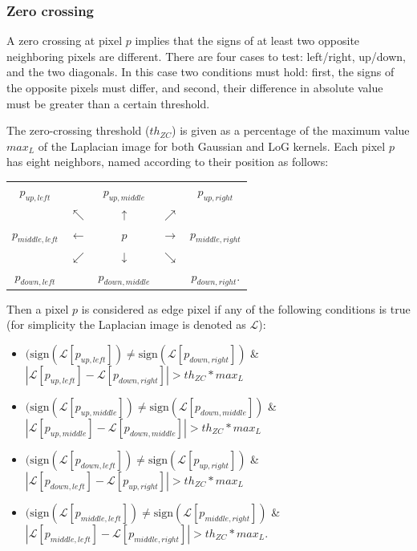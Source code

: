 \documentclass{ipol}
\numberwithin{equation}{section}
\numberwithin{table}{section}
\begin{document}


\subsubsection{Zero crossing}


A zero crossing at pixel $p$ implies that the signs of at least two opposite neighboring pixels are 
different. There are four cases to test: left/right, up/down, and the two diagonals. In this case 
two conditions must hold: first, the signs of the opposite pixels must differ, and second, their 
difference in absolute value must be greater than a certain threshold. 

The zero-crossing threshold ($th_{ZC}$) is given as a percentage of the maximum value $max_L$ of the Laplacian 
image for both Gaussian and LoG kernels. Each pixel $p$ has eight neighbors, named according to their position 
as follows:

\begin{center}
\begin{tabular}{ c c c c c }
	$p_{up,left}$		& 					& $p_{up,middle}$	&					& $p_{up,right}$ 		\\
						& $\nwarrow$		& $\uparrow$		& $\nearrow$		&						\\
	$p_{middle,left}$	& $\leftarrow$		& $p$				& $\rightarrow$		& $p_{middle,right}$	\\
						& $\swarrow$		& $\downarrow$		& $\searrow$		&						\\
	$p_{down,left}$		&					& $p_{down,middle}$	&					& $p_{down,right}$.		\\  
\end{tabular}
\end{center}

Then a pixel $p$ is considered as edge pixel if any of the following conditions is true 
(for simplicity the Laplacian image is denoted as $\mathcal{L}$):
\begin{itemize}
	\item $(\mbox{sign}(\mathcal{L}[p_{up,left}])\neq\mbox{sign}(\mathcal{L}[p_{down,right}])$ \& $|\mathcal{L}[p_{up,left}]-\mathcal{L}[p_{down,right}]|>th_{ZC}*max_L$
	\item $(\mbox{sign}(\mathcal{L}[p_{up,middle}])\neq\mbox{sign}(\mathcal{L}[p_{down,middle}])$ \& $|\mathcal{L}[p_{up,middle}]-\mathcal{L}[p_{down,middle}]|>th_{ZC}*max_L$
	\item $(\mbox{sign}(\mathcal{L}[p_{down,left}])\neq\mbox{sign}(\mathcal{L}[p_{up,right}])$ \& $|\mathcal{L}[p_{down,left}]-\mathcal{L}[p_{up,right}]|>th_{ZC}*max_L$
	\item $(\mbox{sign}(\mathcal{L}[p_{middle,left}])\neq\mbox{sign}(\mathcal{L}[p_{middle,right}])$ \& $|\mathcal{L}[p_{middle,left}]-\mathcal{L}[p_{middle,right}]|>th_{ZC}*max_L$. \\
\end{itemize}
\end{document}
